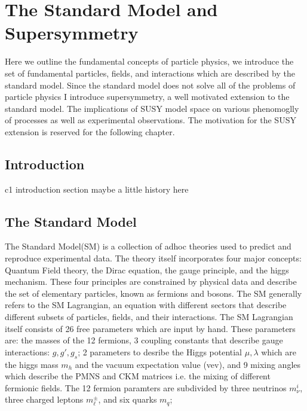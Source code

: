 



\setcounter{secnumdepth}{3}
\setcounter{tocdepth}{3}
\setlength{\parskip}{\smallskipamount}
\setlength{\parindent}{0pt}


\makeatletter


\providecommand{\tabularnewline}{\\}


\makeatother

%

\chapter{The Standard Model and Supersymmetry}

\begin{chapterabstract}
Here we outline the fundamental concepts of particle physics, we introduce the set of fundamental particles, fields, and interactions which are described by the standard model. Since the standard model does not solve all of the problems of particle physics I introduce supersymmetry, a well motivated extension to the standard model. The implications of SUSY model space on various phenomoglly of processes as well as experimental observations.  The motivation for the SUSY extension is reserved for the following chapter.

\end{chapterabstract}

\section{Introduction}

c1 introduction section
maybe a little history here



\section{The Standard Model}

The Standard Model(SM) is a collection of adhoc theories used to predict and reproduce experimental data. The theory itself incorporates four major concepts: Quantum Field theory, the Dirac equation, the gauge principle, and the higgs mechanism. These four principles are constrained by physical data and describe the set of elementary particles, known as fermions and bosons. The SM generally refers to the SM Lagrangian, an equation with different sectors that describe different subsets of particles, fields, and their interactions. The SM Lagrangian itself consists of 26 free parameters which are input by hand. These parameters are: the masses of the 12 fermions, 3 coupling constants that describe gauge interactions: $g, g', g_s$; 2 parameters to desribe the Higgs potential $\mu, \lambda$ which are the higgs mass $m_h$ and the vacuum expectation value (vev), and 9 mixing angles which describe the  PMNS and CKM matrices i.e. the mixing of different fermionic fields. The 12 fermion paramters are subdivided by three neutrinos $m_\nu^i$, three charged leptons $m_\ell^\pm$, and six quarks $m_q$; 

